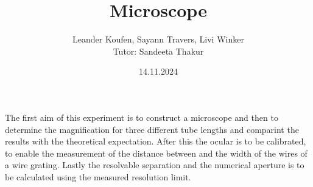 \documentclass[fontsize=11pt, paper=a4, DIV=12]{scrartcl}
\title{Microscope}
\date{14.11.2024}
\author{Leander Koufen, Sayann Travers, Livi Winker\\
Tutor: Sandeeta Thakur}
\begin{document}
\maketitle

\tableofcontents
\clearpage

The first aim of this experiment is to construct a microscope and then to determine the magnification for three different tube lengths
and comparint the results with the theoretical expectation. After this the ocular is to be calibrated, to enable the measurement of the
distance between and the width of the wires of a wire grating.
Lastly the resolvable separation and the numerical aperture is to be calculated using the measured resolution limit.

\newpage





%


\end{document}
